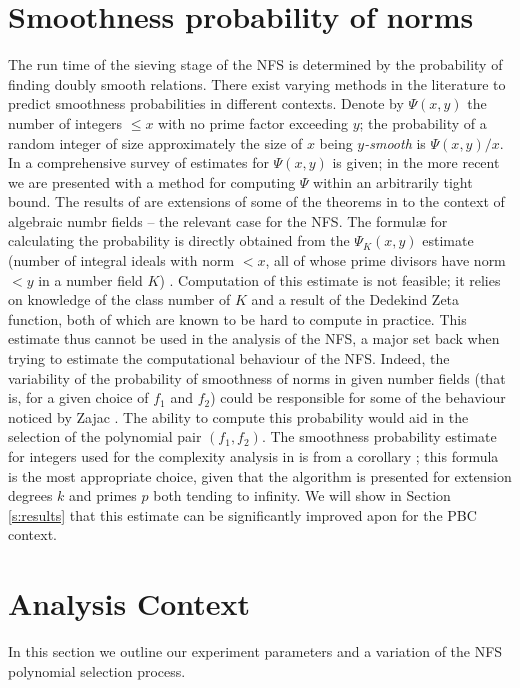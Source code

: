 \documentclass[a4paper, 12pt, envcountsect, runningheads]{llncs}
\numberwithin{figure}{section}
\numberwithin{equation}{section}
\begin{document}
\section{Smoothness probability of norms}
\label{s:smooth}
The run time of the sieving stage of the NFS is determined by the probability of finding doubly smooth relations. There exist varying methods in the literature to predict smoothness probabilities in different contexts.
Denote by $\Psi(x,y)$ the number of integers $\leq x$ with no prime factor exceeding $y$; the probability of a random integer of size approximately the size of $x$ being {\em $y$-smooth} is $\Psi(x,y)/x.$ 
In \cite{hild-tene} a comprehensive survey of estimates for $\Psi(x,y)$ is given; in the more recent \cite{dan_psi_est} we are presented with a method for computing $\Psi$ within an arbitrarily tight bound. The results of \cite{krause} are extensions of some of the theorems in \cite{hild-tene} to the context of algebraic numbr fields -- the relevant case for the NFS. The formul{\ae} for calculating the probability is directly obtained from the $\Psi_K(x,y)$ estimate (number of integral ideals with norm $< x$, all of whose prime divisors have norm $< y$ in a number field $K$) \cite[Satz 3]{krause}. Computation of this estimate is not feasible; it relies on knowledge of the class number of $K$ and a result of the Dedekind Zeta function, both of which are known to be hard to compute in practice. This estimate thus cannot be used in the analysis of the NFS, a major set back when trying to estimate the computational behaviour of the NFS. Indeed, the variability of the probability of smoothness of norms in given number fields (that is, for a given choice of $f_1$ and $f_2$) could be responsible for some of the behaviour noticed by Zajac \cite{zajac}. The ability to compute this probability would aid in the selection of the polynomial pair $(f_1,f_2)$. 
The smoothness probability estimate for integers used for the complexity analysis in \cite{joux-lercier-smart-vercauteren06} is from a corollary \cite[page 15]{can-er-pom}; this formula is the most appropriate choice, given that the algorithm is presented for extension degrees $k$ and primes $p$ both tending to infinity. We will show in Section \ref{s:results} that this estimate can be significantly improved apon for the PBC context.

\section{Analysis Context}
\label{s:context}
In this section we outline our experiment parameters and a variation of the NFS polynomial selection process. 
\end{document}

